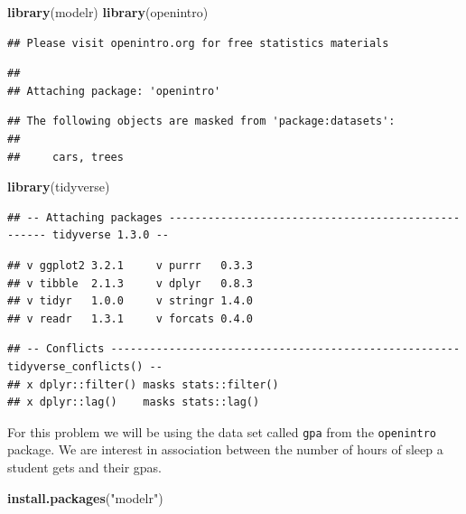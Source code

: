 \documentclass[]{article}
\newenvironment{Shaded}{\begin{snugshade}}{\end{snugshade}}
\newcommand{\KeywordTok}[1]{\textcolor[rgb]{0.13,0.29,0.53}{\textbf{#1}}}
\newcommand{\NormalTok}[1]{#1}
\newcommand{\StringTok}[1]{\textcolor[rgb]{0.31,0.60,0.02}{#1}}
\begin{document}
\begin{Shaded}
\begin{Highlighting}[]
\KeywordTok{library}\NormalTok{(modelr)}
\KeywordTok{library}\NormalTok{(openintro)}
\end{Highlighting}
\end{Shaded}

\begin{verbatim}
## Please visit openintro.org for free statistics materials
\end{verbatim}

\begin{verbatim}
## 
## Attaching package: 'openintro'
\end{verbatim}

\begin{verbatim}
## The following objects are masked from 'package:datasets':
## 
##     cars, trees
\end{verbatim}

\begin{Shaded}
\begin{Highlighting}[]
\KeywordTok{library}\NormalTok{(tidyverse)}
\end{Highlighting}
\end{Shaded}

\begin{verbatim}
## -- Attaching packages --------------------------------------------------- tidyverse 1.3.0 --
\end{verbatim}

\begin{verbatim}
## v ggplot2 3.2.1     v purrr   0.3.3
## v tibble  2.1.3     v dplyr   0.8.3
## v tidyr   1.0.0     v stringr 1.4.0
## v readr   1.3.1     v forcats 0.4.0
\end{verbatim}

\begin{verbatim}
## -- Conflicts ------------------------------------------------------ tidyverse_conflicts() --
## x dplyr::filter() masks stats::filter()
## x dplyr::lag()    masks stats::lag()
\end{verbatim}

For this problem we will be using the data set called \texttt{gpa} from
the \texttt{openintro} package. We are interest in association between
the number of hours of sleep a student gets and their gpas.

\begin{Shaded}
\begin{Highlighting}[]
\KeywordTok{install.packages}\NormalTok{(}\StringTok{"modelr"}\NormalTok{)}
\end{Highlighting}
\end{Shaded}
\end{document}
